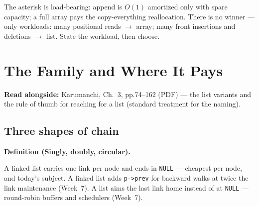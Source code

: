 \documentclass[11pt]{article}
\newenvironment{definitionbox}[1]{%
  \par\noindent\textbf{Definition (#1).}\ \itshape
}{\par\vspace{0.3em}}
\begin{document}
The asterisk is load-bearing: append is $O(1)$ amortized only with spare capacity; a full array pays the copy-everything reallocation. There is no winner --- only workloads: many positional reads $\to$ array; many front insertions and deletions $\to$ list. State the workload, then choose.

\section{The Family and Where It Pays}

\textbf{Read alongside:} Karumanchi, Ch.~3, pp.74--162 (PDF) --- the list variants and the rule of thumb for reaching for a list (standard treatment for the naming).

\subsection{Three shapes of chain}

\begin{definitionbox}{Singly, doubly, circular}
A  linked list carries one link per node and ends in \texttt{NULL} --- cheapest per node, and today's subject. A  linked list adds \texttt{p->prev} for backward walks at twice the link maintenance (Week~7). A  list aims the last link home instead of at \texttt{NULL} --- round-robin buffers and schedulers (Week~7).
\end{definitionbox}
\end{document}

